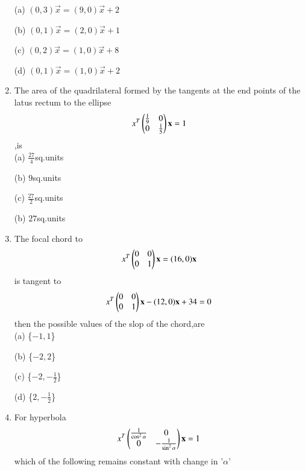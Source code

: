 \documentclass[journal,12pt,twocolumn]{IEEEtran}
\begin{document}
\begin{enumerate}
    \choice (a) $(0,3)\vec x=(9,0)\vec x+2$
    
    \choice (b) $(0,1)\vec x=(2,0)\vec x+1$
    
    \choice (c) $(0,2)\vec x=(1,0)\vec x+8$
    
    \choice (d) $(0,1)\vec x=(1,0)\vec x+2$\\
    
    \item The area of the quadrilateral formed by the tangents at the end points of the latus rectum to the ellipse \begin{align} x^T \begin{pmatrix}\frac{1}{9} & 0 \\0 & \frac{1}{5}\end{pmatrix} \mathbf x=1\end{align},is\\
    
    \choice (a) $\frac{27}{4}$sq.units
    
    \choice (b) $9$sq.units
    
    \choice (c) $\frac{27}{2}$sq.units
    
    \choice (b) $27$sq.units\\
    
    \item The focal chord to \begin{align} x^T \begin{pmatrix}0 & 0 \\0 & 1\end{pmatrix}\mathbf x=(16,0)\mathbf x\end{align} is tangent to \begin{align} x^T\begin{pmatrix}0 & 0 \\0 & 1\end{pmatrix}\mathbf x-(12,0)\mathbf x+34=0\end {align} then the possible values of the slop of the chord,are \\
    
    \choice (a) \{${-1,1}$\}
    
    \choice (b) \{${-2,2}$\}
    
    \choice (c) \{${-2,-\frac{1}{2}}$\}
    
    \choice (d) \{${2,-\frac{1}{2}}$\}\\
    
    \item For hyperbola \begin{align} x^T\begin{pmatrix}\frac{1}{\cos^2\alpha} & 0 \\0 & -\frac{1}{\sin^2\alpha}\end{pmatrix} \mathbf x=1\end{align} which of the following remains constant with change in '$\alpha$'\\
    

\end{enumerate}
\end{document}
